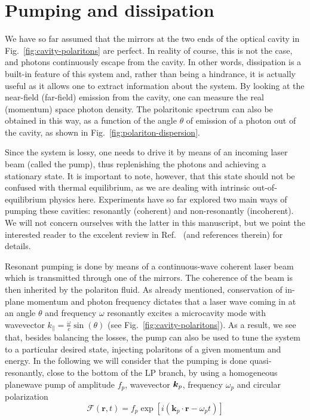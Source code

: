 \section{Pumping and dissipation}
\label{sec:pumping}

We have so far assumed that the mirrors at the two ends of the optical
cavity in Fig.~\ref{fig:cavity-polaritons} are perfect. In reality of
course, this is not the case, and photons continuously escape from the
cavity. In other words, dissipation is a built-in feature of this
system and, rather than being a hindrance, it is actually useful as it
allows one to extract information about the system. By looking at
the near-field (far-field) emission from the cavity, one can measure
the real (momentum) space photon density. The polaritonic spectrum can
also be obtained in this way, as a function of the angle $\theta$ of
emission of a photon out of the cavity, as shown in
Fig.~\ref{fig:polariton-dispersion}.

Since the system is lossy, one needs to drive it by means of an
incoming laser beam (called the pump), thus replenishing the photons
and achieving a stationary state. It is important to note, however,
that this state should not be confused with thermal equilibrium, as we
are dealing with intrinsic out-of-equilibrium physics
here. Experiments have so far explored two main ways of pumping these
cavities: resonantly (coherent) and non-resonantly (incoherent). We
will not concern ourselves with the latter in this manuscript, but we
point the interested reader to the excelent review in
Ref.~\cite{Carusotto_2013} (and references therein) for details.

Resonant pumping is done by means of a continuous-wave coherent laser
beam which is transmitted through one of the mirrors. The coherence of
the beam is then inherited by the polariton fluid.  As already
mentioned, conservation of in-plane momentum and photon frequency
dictates that a laser wave coming in at an angle $\theta$ and
frequency $\omega$ resonantly excites a microcavity mode with
wavevector $k_{\parallel} = \frac{\omega}{c}\sin(\theta)$ (see
Fig.~\ref{fig:cavity-polaritons}). As a result, we see that, besides
balancing the losses, the pump can also be used to tune the system to
a particular desired state, injecting polaritons of a given momentum
and energy. In the following we will consider that the pumping is done
quasi-resonantly, close to the bottom of the LP branch, by using a
homogeneous planewave pump of amplitude $f_p$, wavevector $\bm{k}_p$,
frequency $\omega_p$ and circular polarization
\begin{equation}\label{eq:pwpump}
  \mathcal{F}(\bm{r},t) = f_p \exp{\left[i (\bm{k}_p \cdot \bm{r} -
    \omega_p t)\right]}
\end{equation}

